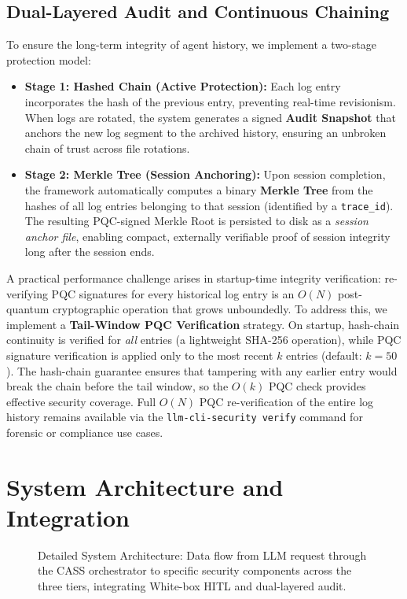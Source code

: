 \documentclass[conference]{IEEEtran}
\begin{document}
\subsection{Dual-Layered Audit and Continuous Chaining}
To ensure the long-term integrity of agent history, we implement a two-stage protection model:
\begin{itemize}
    \item \textbf{Stage 1: Hashed Chain (Active Protection):} Each log entry incorporates the hash of the previous entry, preventing real-time revisionism. When logs are rotated, the system generates a signed \textbf{Audit Snapshot} that anchors the new log segment to the archived history, ensuring an unbroken chain of trust across file rotations.
    \item \textbf{Stage 2: Merkle Tree (Session Anchoring):} Upon session completion, the framework automatically computes a binary \textbf{Merkle Tree} from the hashes of all log entries belonging to that session (identified by a \texttt{trace\_id}). The resulting PQC-signed Merkle Root is persisted to disk as a \textit{session anchor file}, enabling compact, externally verifiable proof of session integrity long after the session ends.
\end{itemize}

A practical performance challenge arises in startup-time integrity verification: re-verifying PQC signatures for every historical log entry is an $O(N)$ post-quantum cryptographic operation that grows unboundedly. To address this, we implement a \textbf{Tail-Window PQC Verification} strategy. On startup, hash-chain continuity is verified for \textit{all} entries (a lightweight SHA-256 operation), while PQC signature verification is applied only to the most recent $k$ entries (default: $k=50$). The hash-chain guarantee ensures that tampering with any earlier entry would break the chain before the tail window, so the $O(k)$ PQC check provides effective security coverage. Full $O(N)$ PQC re-verification of the entire log history remains available via the \texttt{llm-cli-security verify} command for forensic or compliance use cases.

\section{System Architecture and Integration}
\label{sec:arch}

\begin{figure}[t]
\centering
\resizebox{0.95\textwidth}{!}{
    
}
\caption{Detailed System Architecture: Data flow from LLM request through the CASS orchestrator to specific security components across the three tiers, integrating White-box HITL and dual-layered audit.}
\label{fig:detailed_arch}
\end{figure}
\end{document}

